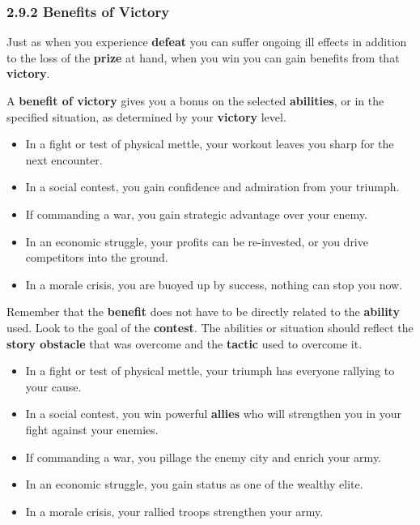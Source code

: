 \documentclass[
]{article}
\providecommand{\tightlist}{%
  \setlength{\itemsep}{0pt}\setlength{\parskip}{0pt}}
\begin{document}
\hypertarget{benefits-of-victory}{%
\subsubsection{2.9.2 Benefits of Victory}\label{benefits-of-victory}}

Just as when you experience \textbf{defeat} you can suffer ongoing ill
effects in addition to the loss of the \textbf{prize} at hand, when you
win you can gain benefits from that \textbf{victory}.

A \textbf{benefit of victory} gives you a bonus on the selected
\textbf{abilities}, or in the specified situation, as determined by your
\textbf{victory} level.

\begin{itemize}
\tightlist
\item
  In a fight or test of physical mettle, your workout leaves you sharp
  for the next encounter.
\item
  In a social contest, you gain confidence and admiration from your
  triumph.
\item
  If commanding a war, you gain strategic advantage over your enemy.
\item
  In an economic struggle, your profits can be re-invested, or you drive
  competitors into the ground.
\item
  In a morale crisis, you are buoyed up by success, nothing can stop you
  now.
\end{itemize}

Remember that the \textbf{benefit} does not have to be directly related
to the \textbf{ability} used. Look to the goal of the \textbf{contest}.
The abilities or situation should reflect the \textbf{story obstacle}
that was overcome and the \textbf{tactic} used to overcome it.

\begin{itemize}
\tightlist
\item
  In a fight or test of physical mettle, your triumph has everyone
  rallying to your cause.
\item
  In a social contest, you win powerful \textbf{allies} who will
  strengthen you in your fight against your enemies.
\item
  If commanding a war, you pillage the enemy city and enrich your army.
\item
  In an economic struggle, you gain status as one of the wealthy elite.
\item
  In a morale crisis, your rallied troops strengthen your army.
\end{itemize}
\end{document}
